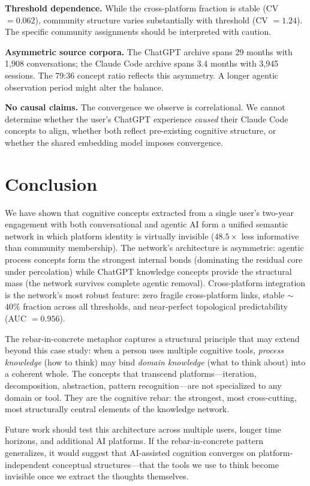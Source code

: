 \documentclass[11pt,twocolumn]{article}
\begin{document}
\textbf{Threshold dependence.}
While the cross-platform fraction is stable (CV $= 0.062$), community structure varies substantially with threshold (CV $= 1.24$).
The specific community assignments should be interpreted with caution.

\textbf{Asymmetric source corpora.}
The ChatGPT archive spans 29 months with 1,908 conversations; the Claude Code archive spans 3.4 months with 3,945 sessions.
The $79$:$36$ concept ratio reflects this asymmetry.
A longer agentic observation period might alter the balance.

\textbf{No causal claims.}
The convergence we observe is correlational.
We cannot determine whether the user's ChatGPT experience \emph{caused} their Claude Code concepts to align, whether both reflect pre-existing cognitive structure, or whether the shared embedding model imposes convergence.


\section{Conclusion}
\label{sec:conclusion}

We have shown that cognitive concepts extracted from a single user's two-year engagement with both conversational and agentic AI form a unified semantic network in which platform identity is virtually invisible ($48.5\times$ less informative than community membership).
The network's architecture is asymmetric: agentic process concepts form the strongest internal bonds (dominating the residual core under percolation) while ChatGPT knowledge concepts provide the structural mass (the network survives complete agentic removal).
Cross-platform integration is the network's most robust feature: zero fragile cross-platform links, stable $\sim$$40\%$ fraction across all thresholds, and near-perfect topological predictability (AUC $= 0.956$).

The rebar-in-concrete metaphor captures a structural principle that may extend beyond this case study: when a person uses multiple cognitive tools, \emph{process knowledge} (how to think) may bind \emph{domain knowledge} (what to think about) into a coherent whole.
The concepts that transcend platforms---iteration, decomposition, abstraction, pattern recognition---are not specialized to any domain or tool.
They are the cognitive rebar: the strongest, most cross-cutting, most structurally central elements of the knowledge network.

Future work should test this architecture across multiple users, longer time horizons, and additional AI platforms.
If the rebar-in-concrete pattern generalizes, it would suggest that AI-assisted cognition converges on platform-independent conceptual structures---that the tools we use to think become invisible once we extract the thoughts themselves.



\end{document}
